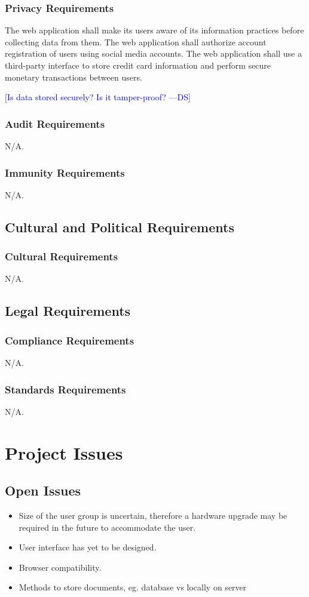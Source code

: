 \documentclass[12pt, titlepage]{article}
\newcommand{\authornote}[3]{\textcolor{#1}{[#3 ---#2]}}
\newcommand{\authornote}[3]{}
\newcommand{\ds}[1]{\authornote{blue}{DS}{#1}}
\begin{document}
{\subsubsection{Privacy Requirements}
The web application shall make its users aware of its information practices 
before collecting data from them. The web application shall authorize account 
registration of users using social media accounts. The web application shall use 
a third-party interface to store credit card information and perform secure 
monetary transactions between users.

\ds{Is data stored securely? Is it tamper-proof?}
\subsubsection{Audit Requirements}
N/A.
\subsubsection{Immunity Requirements}
N/A.
\subsection{Cultural and Political Requirements}
\subsubsection{Cultural Requirements}
N/A.
\subsection{Legal Requirements}
\subsubsection{Compliance Requirements}
N/A.
\subsubsection{Standards Requirements}
N/A.

\section{Project Issues}
\subsection{Open Issues}
\begin{itemize}
  \item Size of the user group is uncertain, therefore a hardware upgrade may be 
required in the future to accommodate the user.
  \item User interface has yet to be designed.
  \item Browser compatibility.
  \item Methods to store documents, eg. database vs locally on server
\end{itemize}

}
\end{document}
